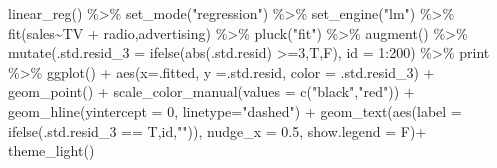 \documentclass[
  letterpaper,
  DIV=11,
  numbers=noendperiod]{scrreprt}
\newenvironment{Shaded}{\begin{snugshade}}{\end{snugshade}}
\newcommand{\AttributeTok}[1]{\textcolor[rgb]{0.65,0.35,0.00}{#1}}
\newcommand{\DecValTok}[1]{\textcolor[rgb]{0.47,0.16,0.63}{#1}}
\newcommand{\FloatTok}[1]{\textcolor[rgb]{0.65,0.35,0.00}{#1}}
\newcommand{\FunctionTok}[1]{\textcolor[rgb]{0.02,0.16,0.49}{#1}}
\newcommand{\NormalTok}[1]{\textcolor[rgb]{0.33,0.33,0.33}{#1}}
\newcommand{\SpecialCharTok}[1]{\textcolor[rgb]{0.00,0.46,0.62}{#1}}
\newcommand{\StringTok}[1]{\textcolor[rgb]{0.00,0.50,0.00}{#1}}
\begin{document}
\begin{Shaded}
\begin{Highlighting}[]
\FunctionTok{linear\_reg}\NormalTok{() }\SpecialCharTok{\%\textgreater{}\%} 
  \FunctionTok{set\_mode}\NormalTok{(}\StringTok{"regression"}\NormalTok{) }\SpecialCharTok{\%\textgreater{}\%} 
  \FunctionTok{set\_engine}\NormalTok{(}\StringTok{"lm"}\NormalTok{) }\SpecialCharTok{\%\textgreater{}\%} 
  \FunctionTok{fit}\NormalTok{(sales}\SpecialCharTok{\textasciitilde{}}\NormalTok{TV }\SpecialCharTok{+}\NormalTok{ radio,advertising) }\SpecialCharTok{\%\textgreater{}\%} 
  \FunctionTok{pluck}\NormalTok{(}\StringTok{"fit"}\NormalTok{) }\SpecialCharTok{\%\textgreater{}\%} 
  \FunctionTok{augment}\NormalTok{() }\SpecialCharTok{\%\textgreater{}\%} 
  \FunctionTok{mutate}\NormalTok{(}\AttributeTok{.std.resid\_3 =} \FunctionTok{ifelse}\NormalTok{(}\FunctionTok{abs}\NormalTok{(.std.resid) }\SpecialCharTok{\textgreater{}=}\DecValTok{3}\NormalTok{,T,F), }\AttributeTok{id =} \DecValTok{1}\SpecialCharTok{:}\DecValTok{200}\NormalTok{) }\SpecialCharTok{\%\textgreater{}\%} 
\NormalTok{  print }\SpecialCharTok{\%\textgreater{}\%} 
  \FunctionTok{ggplot}\NormalTok{() }\SpecialCharTok{+} \FunctionTok{aes}\NormalTok{(}\AttributeTok{x=}\NormalTok{.fitted, }\AttributeTok{y =}\NormalTok{.std.resid, }\AttributeTok{color =}\NormalTok{ .std.resid\_3) }\SpecialCharTok{+} \FunctionTok{geom\_point}\NormalTok{() }\SpecialCharTok{+} \FunctionTok{scale\_color\_manual}\NormalTok{(}\AttributeTok{values =} \FunctionTok{c}\NormalTok{(}\StringTok{"black"}\NormalTok{,}\StringTok{"red"}\NormalTok{)) }\SpecialCharTok{+} 
  \FunctionTok{geom\_hline}\NormalTok{(}\AttributeTok{yintercept =} \DecValTok{0}\NormalTok{, }\AttributeTok{linetype=}\StringTok{"dashed"}\NormalTok{) }\SpecialCharTok{+}
  \FunctionTok{geom\_text}\NormalTok{(}\FunctionTok{aes}\NormalTok{(}\AttributeTok{label =} \FunctionTok{ifelse}\NormalTok{(.std.resid\_3 }\SpecialCharTok{==}\NormalTok{ T,id,}\StringTok{""}\NormalTok{)), }\AttributeTok{nudge\_x =} \FloatTok{0.5}\NormalTok{, }\AttributeTok{show.legend =}\NormalTok{ F)}\SpecialCharTok{+} \FunctionTok{theme\_light}\NormalTok{() }
\end{Highlighting}
\end{Shaded}
\end{document}

